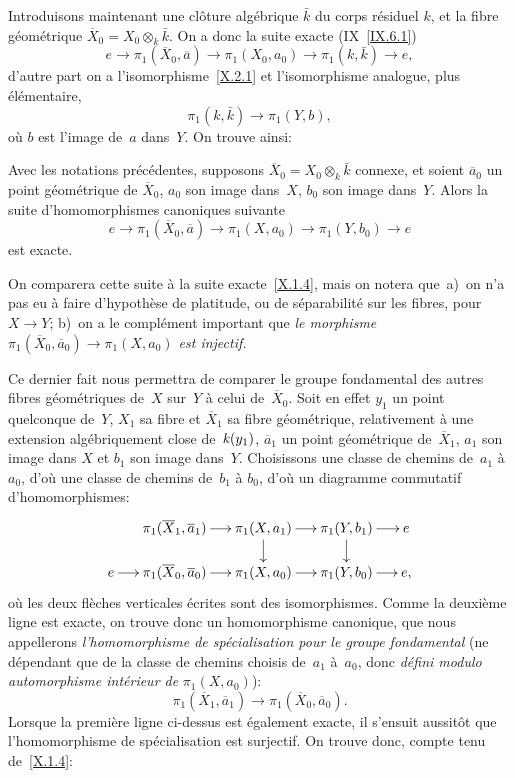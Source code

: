 Introduisons maintenant une cl\^oture alg\'ebrique $\bar{k}$ du
corps r\'esiduel $k$, et la fibre g\'eom\'etrique $\overline X_0
= X_0\otimes_k \bar{k}$. On a donc la suite exacte (IX~\ref{IX.6.1})
$$
e\to \pi_1(\overline X_0,\overline a)\to \pi_1(X_0,a_0)\to
\pi_1(k,\bar{k})\to e,
$$
d'autre part on a l'isomorphisme~\ref{X.2.1} et l'isomorphisme
analogue, plus \'el\'ementaire,
$$
\pi_1(k,\bar{k})\to \pi_1(Y,b),
$$
o\`u $b$ est l'image de~$a$ dans~$Y$. On trouve ainsi:

\begin{corollaire}
\label{X.2.2}
Avec les notations pr\'ec\'edentes, supposons
$\overline X_0=X_0\otimes_k \bar{k}$
connexe, et soient $\overline a_0$ un point g\'eom\'etrique de
$\overline X_0$, $a_0$ son image dans~$X$,
$b_0$ son image dans~$Y$. Alors la suite d'homomorphismes canoniques
suivante
$$
e\to \pi_1(\overline X_0,\overline a)\to \pi_1(X,a_0)\to
\pi_1(Y,b_0)\to e
$$
est exacte.
\end{corollaire}

On comparera cette suite \`a la suite exacte~\ref{X.1.4}, mais on
notera que~a)~on n'a pas eu \`a faire d'hypoth\`ese de platitude,
ou de s\'eparabilit\'e sur les fibres, pour $X\to Y$; b)~on a le
compl\'ement important que \emph{le morphisme $\pi_1(\overline
X_0,\overline a_0)\to \pi_1(X,a_0)$ est injectif.}

Ce dernier fait nous permettra de comparer le groupe fondamental des
autres
fibres g\'eom\'etriques de~$X$ sur~$Y$ \`a celui de~$\overline
X_0$. Soit en effet $y_1$ un point quelconque de~$Y$, $X_1$ sa fibre
et $\overline X_1$ sa fibre g\'eom\'etrique, relativement \`a
une extension alg\'ebriquement close de~$\mathit{k}(y_1)$, $\overline a_1$
un point g\'eom\'etrique de~$\overline X_1$, $a_1$ son image dans
$X$ et $b_1$ son image dans~$Y$. Choisissons une \og classe de chemins\fg
de~$a_1$ \`a $a_0$, d'o\`u une classe de chemins de~$b_1$ \`a
$b_0$, d'o\`u un diagramme commutatif d'homomorphismes:
$$
\xymatrix@=.5cm{
&{\pi_1(\overline X_1,\overline a_1)}\ar[r]&{\pi_1(X,a_1)}\ar[r]\ar[d]&{\pi_1(Y,b_1)}\ar[r]\ar[d]&{e}\\{e}\ar[r]&{\pi_1(\overline X_0,\overline a_0)}\ar[r]&{\pi_1(X,a_0)}\ar[r]&{\pi_1(Y,b_0)}\ar[r]&{e,}}
$$
o\`u les deux fl\`eches verticales \'ecrites sont des
isomorphismes. Comme la deuxi\`eme ligne est exacte, on trouve donc
un homomorphisme canonique, que nous appellerons \emph{l'homomorphisme
de spécialisation pour le groupe fondamental} (ne d\'ependant
que de la classe de chemins choisis de~$a_1$ \`a~$a_0$, donc
\emph{défini modulo automorphisme intérieur de}
$\pi_1(X,a_0)$):
$$
\pi_1(\overline X_1,\overline a_1)\to \pi_1(\overline X_0,\overline
a_0).
$$
Lorsque la premi\`ere ligne ci-dessus est \'egalement exacte, il
s'ensuit aussit\^ot que l'homo\-mor\-phisme de sp\'ecialisation
est surjectif. On trouve donc, compte tenu de~\ref{X.1.4}:

